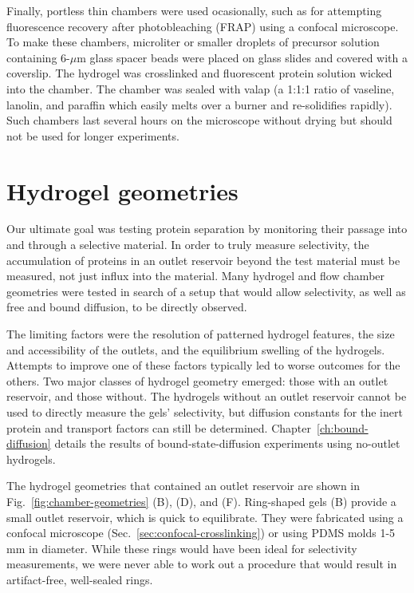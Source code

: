 Finally, portless thin chambers were used ocasionally, such as for attempting fluorescence recovery after photobleaching (FRAP) using a confocal microscope.  To make these chambers, microliter or smaller droplets of precursor solution containing 6-$\mu$m glass spacer beads were placed on glass slides and covered with a coverslip.  The hydrogel was crosslinked and fluorescent protein solution wicked into the chamber.  The chamber was sealed with valap (a 1:1:1 ratio of vaseline, lanolin, and paraffin which easily melts over a burner and re-solidifies rapidly).  Such chambers last several hours on the microscope without drying but should not be used for longer experiments.

\section{Hydrogel geometries}

Our ultimate goal was testing protein separation by monitoring their passage into and through a selective material.  In order to truly measure selectivity, the accumulation of proteins in an outlet reservoir beyond the test material must be measured, not just influx into the material.  Many hydrogel and flow chamber geometries were tested in search of a setup that would allow selectivity, as well as free and bound diffusion, to be directly observed.

The limiting factors were the resolution of patterned hydrogel features, the size and accessibility of the outlets, and the equilibrium swelling of the hydrogels.  Attempts to improve one of these factors typically led to worse outcomes for the others.  Two major classes of hydrogel geometry emerged: those with an outlet reservoir, and those without.  The hydrogels without an outlet reservoir cannot be used to directly measure the gels' selectivity, but diffusion constants for the inert protein and transport factors can still be determined.  Chapter~\ref{ch:bound-diffusion} details the results of bound-state-diffusion experiments using no-outlet hydrogels.

The hydrogel geometries that contained an outlet reservoir are shown in Fig.~\ref{fig:chamber-geometries} (B), (D), and (F).  Ring-shaped gels (B) provide a small outlet reservoir, which is quick to equilibrate.  They were fabricated using a confocal microscope (Sec.~\ref{sec:confocal-crosslinking}) or using PDMS molds 1-5 mm in diameter.  While these rings would have been ideal for selectivity measurements, we were never able to work out a procedure that would result in artifact-free, well-sealed rings.

